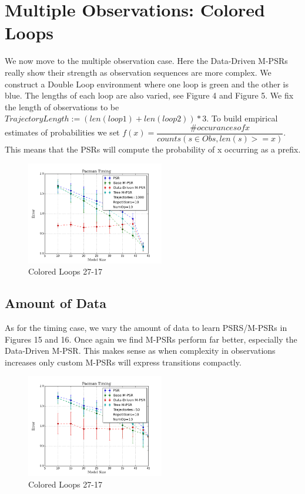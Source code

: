 \section{Multiple Observations: Colored Loops}

We now move to the multiple observation case. Here the Data-Driven M-PSRs really show their strength as observation sequences are more complex. We construct a Double Loop environment where one loop is green and the other is blue. The lengths of each loop are also varied, see Figure 4 and Figure 5. We fix the length of observations to be $TrajectoryLength := (len(loop1) + len(loop2))*3$. To build empirical estimates of probabilities we set $f(x)=\dfrac{\#occurances of x}{counts(s \in Obs, len(s)>=x)}$. This means that the PSRs will compute the probability of x occurring as a prefix.

\begin{figure}[ht!]
\centering
\includegraphics[width=60mm]{uCOREPICS/DLMO/MO_1k.png}
\caption{Colored Loops 27-17\label{overflow}}
\end{figure}


\subsection{Amount of Data}

As for the timing case, we vary the amount of data to learn PSRS/M-PSRs in Figures 15 and 16. Once again we find M-PSRs perform far better, especially the Data-Driven M-PSR. This makes sense as when complexity in observations increases only custom M-PSRs will express transitions compactly.

\begin{figure}[ht!]
\centering
\includegraphics[width=60mm]{uCOREPICS/DLMO/MO_50.png}
\caption{Colored Loops 27-17\label{overflow}}
\end{figure}

